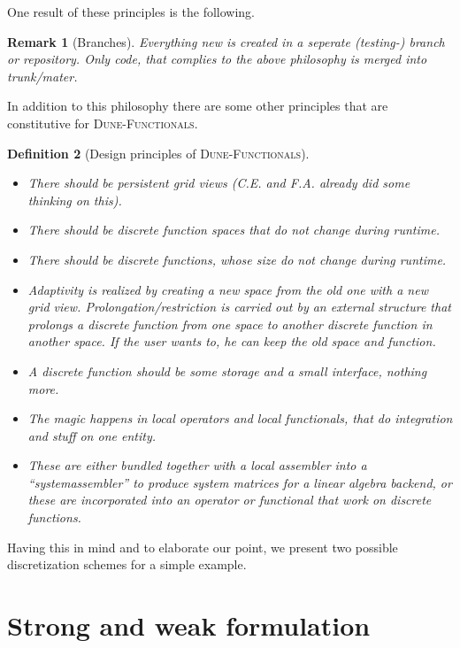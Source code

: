 \documentclass[a4paper,11pt]{article}
\numberwithin{equation}{section}
\newtheorem{definition}{Definition}[section]
\newtheorem{remark}[definition]{Remark}
\newcommand{\theoremEndLine}{\hspace{1mm}}
\newcommand{\theoremItemizeNewline}{\hspace{1mm}\vspace{-3mm}}
\newcommand{\dunefunctionals}{\textsc{Dune-Functionals}\xspace}
\begin{document}
One result of these principles is the following.

\begin{remark}[Branches]
  Everything new is created in a seperate (testing-) branch or repository. Only code, that complies to the above philosophy
  is merged into trunk/mater.
\end{remark}

In addition to this philosophy there are some other principles that are constitutive for \dunefunctionals.

\begin{definition}[Design principles of \dunefunctionals]\theoremItemizeNewline
  \begin{itemize}
    \item There should be persistent grid views (C.E. and F.A. already did some thinking on this).
    \item There should be discrete function spaces that do not change during runtime.
    \item There should be discrete functions, whose size do not change during runtime.
    \item Adaptivity is realized by creating a new space from the old one with a new grid view. Prolongation/restriction
			is carried out by an external structure that prolongs a discrete function from one space to another discrete
			function in another space. If the user wants to, he can keep the old space and function.
		\item A discrete function should be some storage and a small interface, nothing more.
		\item The magic happens in local operators and local functionals, that do integration and stuff on one entity.
		\item These are either bundled together with a local assembler into a ``systemassembler'' to produce system matrices
			for a linear algebra backend, or these are incorporated into an operator or functional that work on discrete
			functions.
  \end{itemize}
\end{definition}\theoremEndLine

Having this in mind and to elaborate our point, we present two possible discretization schemes for a simple example.


\section{Strong and weak formulation}
	\label{section::strong_weak_formulation}
\end{document}
